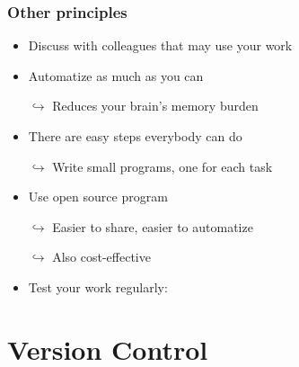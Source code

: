 \documentclass[xcolor=x11names,compress]{beamer}
\renewcommand{\(}{\begin{columns}}
\renewcommand{\)}{\end{columns}}
\newcommand{\<}[1]{\begin{column}{#1}}
\renewcommand{\>}{\end{column}}
\begin{document}
\begin{frame}
\frametitle{Other principles}
    \begin{itemize}[<+->]
        \item Discuss with colleagues that may use your work
        \item Automatize as much as you can
        \item[$\hookrightarrow$] Reduces your brain's memory burden
        \item There are easy steps everybody can do
        \item[$\hookrightarrow$] Write small programs, one for each task
        \item Use open source program
        \item[$\hookrightarrow$] Easier to share, easier to automatize
        \item[$\hookrightarrow$] Also cost-effective
        \item Test your work regularly:
    \end{itemize}
\end{frame}


\section{Version Control}
\end{document}
